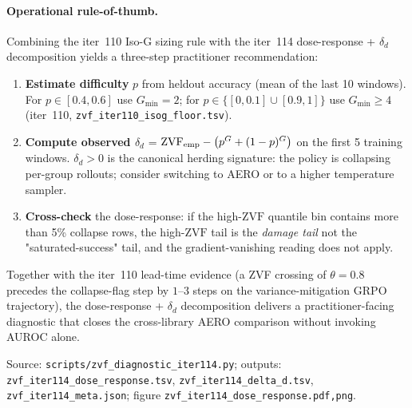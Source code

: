 \paragraph{Operational rule-of-thumb.}
Combining the iter~110 Iso-G sizing rule with the iter~114
dose-response + \(\delta_{d}\) decomposition yields a three-step
practitioner recommendation:

\begin{enumerate}
\item \textbf{Estimate difficulty} \(p\) from heldout accuracy
  (mean of the last 10 windows). For \(p\!\in\![0.4,0.6]\) use
  \(G_{\min}=2\); for \(p\!\in\!\{[0,0.1]\cup[0.9,1]\}\) use
  \(G_{\min}\!\geq\!4\) (iter~110, \texttt{zvf\_iter110\_isog\_floor.tsv}).
\item \textbf{Compute observed \(\delta_{d}\)} = \(\mathrm{ZVF}_{\rm emp}
  - \bigl(p^{G}+(1-p)^{G}\bigr)\) on the first 5 training windows.
  \(\delta_{d}\!>\!0\) is the canonical herding signature: the policy
  is collapsing per-group rollouts; consider switching to AERO or to a
  higher temperature sampler.
\item \textbf{Cross-check} the dose-response: if the high-\(\mathrm{ZVF}\)
  quantile bin contains more than 5\% collapse rows, the
  high-\(\mathrm{ZVF}\) tail is the \emph{damage tail} not the
  "saturated-success" tail, and the gradient-vanishing reading does
  not apply.
\end{enumerate}

\noindent Together with the iter~110 lead-time evidence (a ZVF
crossing of \(\theta=0.8\) precedes the collapse-flag step by
\(1\)--\(3\) steps on the variance-mitigation GRPO trajectory), the
dose-response + \(\delta_{d}\) decomposition delivers a
practitioner-facing diagnostic that closes the cross-library AERO
comparison without invoking AUROC alone.

Source: \texttt{scripts/zvf\_diagnostic\_iter114.py}; outputs:
\texttt{zvf\_iter114\_dose\_response.tsv},
\texttt{zvf\_iter114\_delta\_d.tsv}, \texttt{zvf\_iter114\_meta.json};
figure \texttt{zvf\_iter114\_dose\_response.{pdf,png}}.